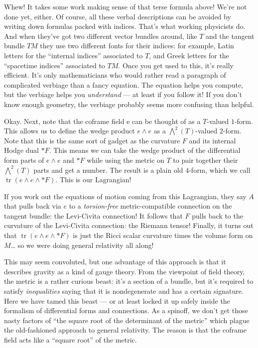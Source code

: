 \documentclass{article}
\begin{document}
Whew! It takes some work making sense of that terse formula above! We're
not done yet, either. Of course, all these verbal descriptions can be
avoided by writing down formulas packed with indices. That's what
working physicists do. And when they've got two different vector bundles
around, like \(T\) and the tangent bundle \(TM\) they use two different
fonts for their indices: for example, Latin letters for the ``internal
indices'' associated to \(T\), and Greek letters for the ``spacetime
indices'' associated to \(TM\). Once you get used to this, it's really
efficient. It's only mathematicians who would rather read a paragraph of
complicated verbiage than a fancy equation. The equation helps you
compute, but the verbiage helps you \emph{understand} --- at least if
you follow it! If you don't know enough geometry, the verbiage probably
seems more confusing than helpful.

Okay. Next, note that the coframe field e can be thought of as a
\(T\)-valued \(1\)-form. This allows us to define the wedge product
\(e\wedge e\) as a \(\bigwedge^2(T)\)-valued \(2\)-form. Note that this
is the same sort of gadget as the curvature \(F\) and its internal Hodge
dual \(*F\). This means we can take the wedge product of the
differential form parts of \(e\wedge e\) and \(*F\) while using the
metric on \(T\) to pair together their \(\bigwedge^2(T)\) parts and get
a number. The result is a plain old \(4\)-form, which we call
\(\operatorname{tr}(e\wedge e\wedge *F)\). This is our Lagrangian!

If you work out the equations of motion coming from this Lagrangian,
they say \(A\) that pulls back via \(e\) to a \emph{torsion-free}
metric-compatible connection on the tangent bundle: the Levi-Civita
connection! It follows that \(F\) pulls back to the curvature of the
Levi-Civita connection: the Riemann tensor! Finally, it turns out that
\(\operatorname{tr}(e\wedge e\wedge *F)\) is just the Ricci scalar
curvature times the volume form on \(M\)\ldots{} so we were doing
general relativity all along!

This may seem convoluted, but one advantage of this approach is that it
describes gravity as a kind of gauge theory. From the viewpoint of field
theory, the metric is a rather curious beast: it's a section of a
bundle, but it's required to satisfy \emph{inequalities} saying that it
is nondegenerate and has a certain signature. Here we have tamed this
beast --- or at least locked it up safely inside the formalism of
differential forms and connections. As a spinoff, we don't get those
nasty factors of ``the square root of the determinant of the metric''
which plague the old-fashioned approach to general relativity. The
reason is that the coframe field acts like a ``square root'' of the
metric.
\end{document}
